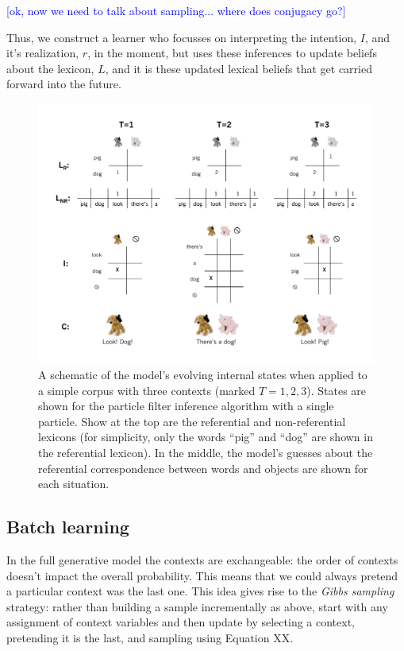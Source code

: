 \documentclass[man,noapacite,12pt]{apa2}
\newcommand{\nnote}[1]{\textcolor{blue}{[#1]}}
\begin{document}
\nnote{ok, now we need to talk about sampling... where does conjugacy go?}

Thus, we construct a learner who focusses on interpreting the intention, $I$, and it's realization, $r$, in the moment, but uses these inferences to update beliefs about the lexicon, $L$, and it is these updated lexical beliefs that get carried forward into the future.

\begin{figure}[H]
\begin{center}
\includegraphics[width=6.25in]{figures/inference_diagram.pdf}
\caption{\label{fig:inference_diagram} A schematic of the model's evolving internal states when applied to a simple corpus with three contexts (marked $T=1,2,3$). States are shown for the particle filter inference algorithm with a single particle. Show at the top are the referential and non-referential lexicons (for simplicity, only the words ``pig'' and ``dog'' are shown in the referential lexicon). In the middle, the model's guesses about the referential correspondence between words and objects are shown for each situation.}
\end{center}
\end{figure}



\subsection{Batch learning}

In the full generative model the contexts are exchangeable: the order of contexts doesn't impact the overall probability. This means that we could always pretend a particular context was the last one. This idea gives rise to the \emph{Gibbs sampling} strategy: rather than building a sample incrementally as above, start with any assignment of context variables and then update by selecting a context, pretending it is the last, and sampling using Equation XX.
\end{document}
